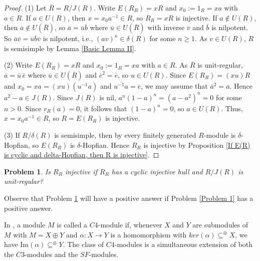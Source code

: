 \documentclass{amsart}
\theoremstyle{plain}
\newtheorem{problem}[theorem]{Problem}
\numberwithin{equation}{section}
\begin{document}
\begin{proof}
(1) Let $\overline{R} =R/J (R)$. Write $E (R_{R}) =x R$ and $x_{0}:=1_{R} =x a$ with $a \in R$. If $a \in U (R)$, then $x =x_{0} a^{ -1} \in R$, so $R_{R} =x R$ is injective. If $a \notin U (R)$, then $\overline{a} \notin U (\overline{R})$, so $\overline{a} =\overline{u} \overline{b}$ where $\overline{u} \in U (\overline{R})$ with inverse $\overline{v}$ and $\overline{b}$ is nilpotent. So $\overline{a} \overline{v} =\overline{u} \overline{b} \overline{v}$ is nilpotent, i.e., $(a v)^{n} \in \delta  (R)$ for some $n \geq 1$. As $v \in U (R)$, $R$ is semisimple by Lemma \ref{Basic Lemma II}. 

(2) Write $E (R_{R}) =x R$ and $x_{0}:=1_{R} =x a$ with $a \in R$. As $\overline{R}$ is unit-regular, $\overline{a} =\overline{u}\, \overline{e}$ where $\overline{u} \in U (\overline{R})$ and $\overline{e}^{2} =\overline{e}$, so $u \in U (R)$. Since $E (R_{R}) =(x u) R$ and $x_{0} =x a =(x u) (u^{ -1} a)$ and $\overline{u^{ -1} a} =\overline{e}$, we may assume that $\overline{a}^{2} =\overline{a}$. Hence $a^{2} -a \in J (R)$. Since $J (R)$ is nil, $a^{n} (1 -a)^{n} =(a -a^{2})^{n} =0$ for some $n >0$. Since $r_{R} (a) =0$, it follows that $(1 -a)^{n} =0$, so $a \in U (R)$. Thus, $x =x_{0} a^{ -1} \in R$, so $R =E (R_{R})$ is injective. 

(3) If $R/\delta  (R)$ is semisimple, then by \cite[Proposition 4]{EKP}
every finitely generated $R$-module is $\delta $-Hopfian, so $E (R_{R})$ is $\delta $-Hopfian. Hence $R_{R}$ is injective by Proposition \ref{If E(R) is cyclic and delta-Hopfian, then R is injective}.
\end{proof}


\begin{problem}
\label{Problem 2} Is $R_{R}$ injective if $R_{R}$ has a cyclic injective hull and $R/J (R)$ is unit-regular? 
\end{problem}

Observe that Problem \ref{Problem 2} will have
a positive answer if Problem \ref{Problem 1} has a positive answer. 

\medskip In \cite{DIYZ 2}, a module $M$ is called a $C 4$-module if, whenever $X$ and $Y$ are submodules of $M$ with $M =X \oplus Y$ and $\alpha  :X \rightarrow Y$ is a homomorphism with $k e r (\alpha )  \subseteq ^{ \oplus }X$, we have $\mathrm{I} \mathrm{m} (\alpha )  \subseteq ^{ \oplus }Y$. The class of $C 4$-modules is a simultaneous extension of both the $C 3$-modules and the $S F$-modules. 
\end{document}
